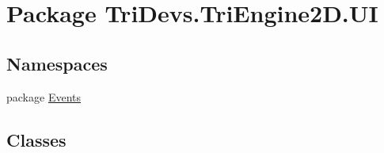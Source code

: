 \hypertarget{namespace_tri_devs_1_1_tri_engine2_d_1_1_u_i}{\section{Package Tri\-Devs.\-Tri\-Engine2\-D.\-U\-I}
\label{namespace_tri_devs_1_1_tri_engine2_d_1_1_u_i}
}
\subsection*{Namespaces}
\begin{DoxyCompactItemize}
\item 
package \hyperlink{namespace_tri_devs_1_1_tri_engine2_d_1_1_u_i_1_1_events}{Events}
\end{DoxyCompactItemize}
\subsection*{Classes}
